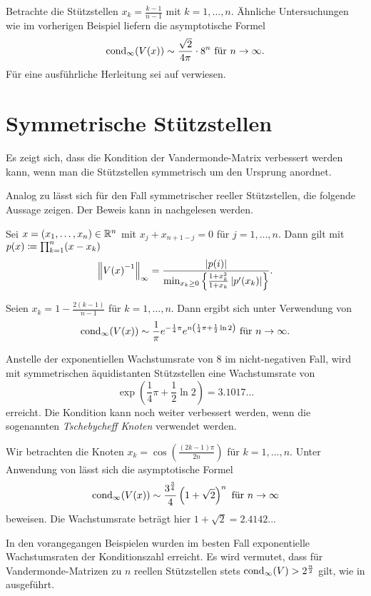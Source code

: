 \begin{example}
    Betrachte die Stützstellen $x_k = \frac{k-1}{n-1}$ mit $k=1, \dots, n$.
    Ähnliche Untersuchungen wie im vorherigen Beispiel liefern die
    asymptotische Formel
    \[
        \cond[\infty]{\Vand{x}} \sim \frac{\sqrt{2}}{4\pi} \cdot 8^n \text{ für } n \rightarrow \infty.
    \]
    Für eine ausführliche Herleitung sei auf \cite[S. 344f]{gautschi3}
    verwiesen.
\end{example}

\section{Symmetrische Stützstellen}
Es zeigt sich, dass die Kondition der Vandermonde-Matrix verbessert werden
kann, wenn man die Stützstellen symmetrisch um den Ursprung anordnet.

Analog zu  lässt sich für den Fall
symmetrischer reeller Stützstellen, die folgende Aussage zeigen.
Der Beweis kann in \cite[S. 341]{gautschi3} nachgelesen werden.
\begin{lemma}
    \label{lemma:symmetric_real_nodes}
    Sei $x = (x_1, \dots, x_n) \in \Rn$ mit $x_j + x_{n+1-j} = 0$ für $j = 1, \dots, n$.
    Dann gilt mit $p(x) \defeq \prod_{k=1}^{n} (x - x_k)$
    \[
        \norm{\Vand{x}^{-1}}_\infty = \frac{\abs{p(i)}}{\min_{x_k \geq 0} \left\{ \frac{1 + x_k^2}{1 + x_k} \abs{p^{\prime}(x_k)} \right\} }.
    \]
\end{lemma}

\begin{example}
    Seien $x_k = 1 - \frac{2(k-1)}{n-1}$ für ${k = 1, \dots, n}$.
    Dann ergibt sich unter Verwendung von 
    \[
        \cond[\infty]{\Vand{x}} \sim \frac{1}{\pi} e^{-\frac{1}{4} \pi} e^{n\left( \frac{1}{4} \pi + \frac{1}{2} \ln 2 \right)} \text{ für } n \rightarrow \infty.
    \]
\end{example}

Anstelle der exponentiellen Wachstumsrate von $8$ im nicht-negativen Fall, wird mit
symmetrischen äquidistanten Stützstellen eine Wachstumsrate von
\[
    \exp \left( \frac{1}{4} \pi + \frac{1}{2} \ln 2 \right) = 3.1017\dots
\]
erreicht.
Die Kondition kann noch weiter verbessert werden, wenn die sogenannten
\emph{Tschebycheff Knoten} verwendet werden.

\begin{example}
    Wir betrachten die Knoten $x_k = \cos \left( \frac{(2k-1) \pi}{2n} \right)$
    für $k=1, \dots, n$.
    Unter Anwendung von  lässt sich die
    asymptotische Formel
    \[
        \cond[\infty]{\Vand{x}} \sim \frac{3^{\frac{3}{4}}}{4} \left( 1 + \sqrt{2} \right)^n \text{ für } n \rightarrow \infty
    \]
    beweisen.
    Die Wachstumsrate beträgt hier $1 + \sqrt{2} = 2.4142..$.
\end{example}

In den vorangegangen Beispielen wurden im besten Fall exponentielle
Wachstumsraten der Konditionszahl erreicht.
Es wird vermutet, dass für
Vandermonde-Matrizen zu $n$ reellen Stützstellen stets
$\cond[\infty]{V} > 2^{\frac{n}{2}}$ gilt, wie in \cite[S. 199]{gautschi1}
ausgeführt.

